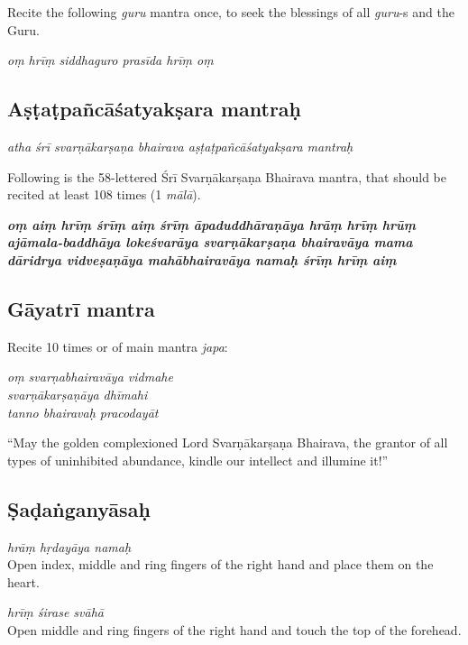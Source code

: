 \documentclass[11pt,oneside,a4paper]{article}
\newenvironment{shloka}[1]
  {\bigskip\center#1\varwidth{\linewidth}}
  {\endvarwidth\endcenter\bigskip}
\newcommand{\tl}[1]{\emph{#1}}
\begin{document}
Recite the following \tl{guru} mantra once, to seek the blessings of all
\tl{guru}-s and the Guru.

\begin{shloka}\itshape
  oṃ hrīṃ siddhaguro prasīda hrīṃ oṃ
\end{shloka}

\subsection{Aṣṭaṭpañcāśatyakṣara mantraḥ}

\begin{shloka}\itshape
  atha śrī svarṇākarṣaṇa bhairava aṣṭaṭpañcāśatyakṣara mantraḥ
\end{shloka}

Following is the 58-lettered Śrī Svarṇākarṣaṇa Bhairava mantra, that should be
recited at least 108 times (1 \tl{mālā}).

\begin{shloka}\itshape\bfseries
  oṃ aiṃ hrīṃ śrīṃ aiṃ śrīṃ āpaduddhāraṇāya hrāṃ hrīṃ hrūṃ ajāmala-baddhāya
  lokeśvarāya svarṇākarṣaṇa bhairavāya mama dāridrya vidveṣaṇāya
  mahābhairavāya namaḥ śrīṃ hrīṃ aiṃ
\end{shloka}

\subsection{Gāyatrī mantra}

Recite 10 times or  of main mantra \tl{japa}:

\begin{shloka}\itshape
  oṃ svarṇabhairavāya vidmahe\\
  svarṇākarṣaṇāya dhīmahi\\
  tanno bhairavaḥ pracodayāt
\end{shloka}

``May the golden complexioned Lord Svarṇākarṣaṇa Bhairava, the grantor of all
types of uninhibited abundance, kindle our intellect and illumine it!''

\subsection{Ṣaḍaṅganyāsaḥ}

\tl{hrāṃ hṛdayāya namaḥ}\\
Open index, middle and ring fingers of the right hand and place them on
the heart.

\tl{hrīṃ śirase svāhā}\\
Open middle and ring fingers of the right hand and touch the top of the forehead.
\end{document}
